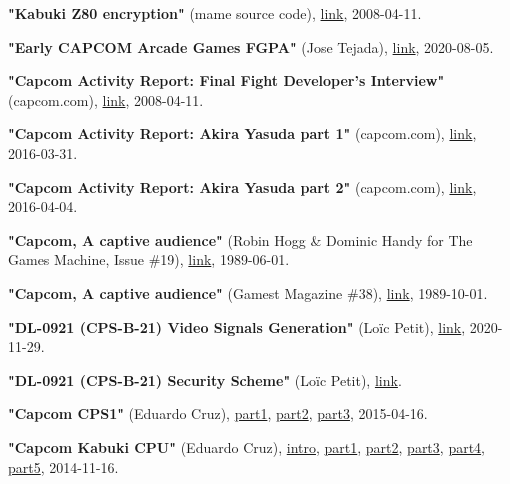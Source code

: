 \begin{thebibliography}{999}
  \textbf{"Kabuki Z80 encryption"} (mame source code),
  \href{https://github.com/mamedev/historic-mame/blob/master/src/mame/machine/kabuki.c}{link},
  2008-04-11.


  \textbf{"Early CAPCOM Arcade Games FGPA"} (Jose Tejada),
  \href{https://github.com/jotego/jt_gng/blob/fb92e5ac0f72323638974034ad652649b6efafcb/README.md}{link},
  2020-08-05.

  \textbf{"Capcom Activity Report: Final Fight Developer's Interview"} (capcom.com),
  \href{https://game.capcom.com/cfn/sfv/column/132673?lang=en}{link},
  2008-04-11.

  \textbf{"Capcom Activity Report: Akira Yasuda part 1"} (capcom.com),
  \href{https://game.capcom.com/cfn/sfv/column/112429}{link},
  2016-03-31.

  \textbf{"Capcom Activity Report: Akira Yasuda part 2"} (capcom.com),
  \href{https://game.capcom.com/cfn/sfv/column/112432}{link},
  2016-04-04.

  \textbf{"Capcom, A captive audience"} (Robin Hogg \& Dominic Handy for The Games Machine, Issue \#19),
  \href{https://archive.org/details/the-games-machine-19/page/n23/mode/2up}{link},
  1989-06-01.

  \textbf{"Capcom, A captive audience"} (Gamest Magazine \#38),
  \href{https://retrocdn.net/images/9/91/Gamest_JP_038.pdf}{link},
  1989-10-01.

  \textbf{"DL-0921 (CPS-B-21) Video Signals Generation"} (Lo\"{i}c Petit),
  \href{https://gitlab.com/loic.petit/cps2-reverse/-/blob/master/DLs/DL-0921/doc/video-signals.md}{link},
  2020-11-29.

  \textbf{"DL-0921 (CPS-B-21) Security Scheme"} (Lo\"{i}c Petit),
  \href{https://gitlab.com/loic.petit/cps2-reverse/-/blob/master/DLs/DL-0921/doc/security-scheme.md}{link}.

  \textbf{"Capcom CPS1"} (Eduardo Cruz),
  \href{http://arcadehacker.blogspot.com/2015/04/capcom-cps1-part-1.html}{part1},
  \href{http://arcadehacker.blogspot.com/2015/05/capcom-cps1-part-2.html}{part2},
  \href{http://arcadehacker.blogspot.com/2015/06/capcom-cps1-part-3.html}{part3},
  2015-04-16.
  
  \textbf{"Capcom Kabuki CPU"} (Eduardo Cruz),
  \href{ http://arcadehacker.blogspot.com/2014/11/capcom-kabuki-cpu-intro.html}{intro},
  \href{http://arcadehacker.blogspot.com/2014/11/capcom-kabuki-cpu-part-1.html}{part1},
  \href{http://arcadehacker.blogspot.com/2014/11/capcom-kabuki-cpu-part-2.html}{part2},
  \href{http://arcadehacker.blogspot.com/2014/11/capcom-kabuki-cpu-part-3.html}{part3},
  \href{http://arcadehacker.blogspot.com/2014/11/capcom-kabuki-cpu-part-4.html}{part4},
  \href{http://arcadehacker.blogspot.com/2014/11/capcom-kabuki-cpu-part-5.html}{part5},
  2014-11-16.


\end{thebibliography}
